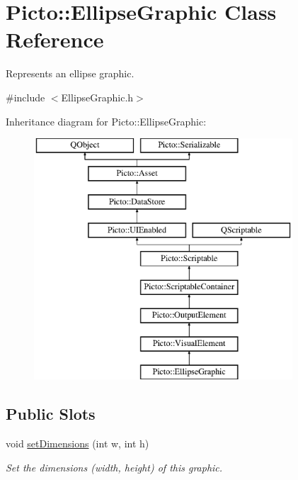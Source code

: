 \hypertarget{class_picto_1_1_ellipse_graphic}{\section{Picto\-:\-:Ellipse\-Graphic Class Reference}
\label{class_picto_1_1_ellipse_graphic}
}


Represents an ellipse graphic.  




{\ttfamily \#include $<$Ellipse\-Graphic.\-h$>$}

Inheritance diagram for Picto\-:\-:Ellipse\-Graphic\-:\begin{figure}[H]
\begin{center}
\leavevmode
\includegraphics[height=9.000000cm]{class_picto_1_1_ellipse_graphic}
\end{center}
\end{figure}
\subsection*{Public Slots}
\begin{DoxyCompactItemize}
\item 
\hypertarget{class_picto_1_1_ellipse_graphic_a797472614d928dc0e787f9ab29f7c774}{void \hyperlink{class_picto_1_1_ellipse_graphic_a797472614d928dc0e787f9ab29f7c774}{set\-Dimensions} (int w, int h)}\label{class_picto_1_1_ellipse_graphic_a797472614d928dc0e787f9ab29f7c774}

\begin{DoxyCompactList}\small\item\em Set the dimensions (width, height) of this graphic. \end{DoxyCompactList}\end{DoxyCompactItemize}
